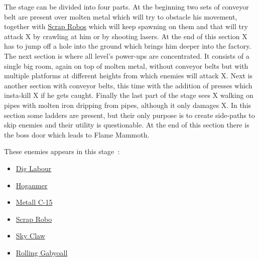 The stage can be divided into four parts. At the beginning two sets of conveyor belt are present over molten metal which will try to obstacle his movement, together with  \hyperlink{enem:Scrap_Robo}{Scrap Robos} which will keep spawning on them and that will try attack X by crawling at him or by shooting lasers. At the end of this section X has to jump off a hole into the ground which brings him deeper into the factory. The next section is where all level's power-ups are concentrated. It consists of a single big room, again on top of molten metal, without conveyor belts but with multiple platforms at different heights from which enemies will attack X. Next is another section with conveyor belts, this time with the addition of presses which insta-kill X if he gets caught. Finally the last part of the stage sees X walking on pipes with molten iron dripping from pipes, although it only damages X. In this section some ladders are present, but their only purpose is to create side-paths to skip enemies and their utility is questionable. At the end of this section there is the boss door which leads to Flame Mammoth.

These enemies appears in this stage~\cite{wiki:Factory}:
\begin{itemize}
	\item \hyperlink{enem:Dig_Labour}{Dig Labour} 
	\item \hyperlink{enem:Hoganmer}{Hoganmer}
	\item \hyperlink{enem:Metall_C-15}{Metall C-15}
	\item \hyperlink{enem:Scrap_Robo}{Scrap Robo}
	\item \hyperlink{enem:Sky_Claw}{Sky Claw}
	\item \hyperlink{enem:Rolling_Gabyoall}{Rolling Gabyoall}
\end{itemize}

